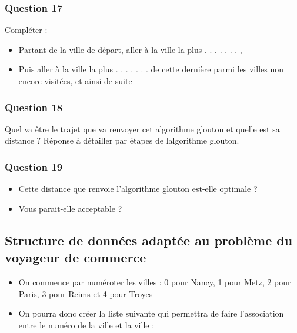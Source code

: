 \documentclass[
  paper=a4,
  ,captions=tableheading
]{scrartcl}
\providecommand{\tightlist}{%
  \setlength{\itemsep}{0pt}\setlength{\parskip}{0pt}}
\begin{document}
\hypertarget{question-17}{%
\subsubsection{Question 17}\label{question-17}}

Compléter :

\begin{itemize}
\tightlist
\item
  Partant de la ville de départ, aller à la ville la plus . . . . . . .
  ,
\item
  Puis aller à la ville la plus . . . . . . . de cette dernière parmi
  les villes non encore visitées, et ainsi de suite
\end{itemize}

\hypertarget{question-18}{%
\subsubsection{Question 18}\label{question-18}}

Quel va être le trajet que va renvoyer cet algorithme glouton et quelle
est sa distance ? Réponse à détailler par étapes de
l\textquotesingle algorithme glouton.

\hypertarget{question-19}{%
\subsubsection{Question 19}\label{question-19}}

\begin{itemize}
\tightlist
\item
  Cette distance que renvoie l'algorithme glouton est-elle optimale ?
\item
  Vous parait-elle acceptable ?
\end{itemize}

\hypertarget{structure-de-donnuxe9es-adaptuxe9e-au-probluxe8me-du-voyageur-de-commerce}{%
\subsection{Structure de données adaptée au problème du voyageur de
commerce}\label{structure-de-donnuxe9es-adaptuxe9e-au-probluxe8me-du-voyageur-de-commerce}}

\begin{itemize}
\tightlist
\item
  On commence par numéroter les villes : 0 pour Nancy, 1 pour Metz, 2
  pour Paris, 3 pour Reims et 4 pour Troyes
\item
  On pourra donc créer la liste suivante qui permettra de faire
  l'association entre le numéro de la ville et la ville :
\end{itemize}
\end{document}
